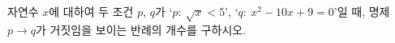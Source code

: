 자연수 $x$에 대하여 두 조건 $p$, $q$가 `$p:\ \sqrt{x}<5$', `$q:\ x^2-10x+9=0$'일 때, 명제 $p\longrightarrow q$가 거짓임을 보이는 반례의 개수를 구하시오.
